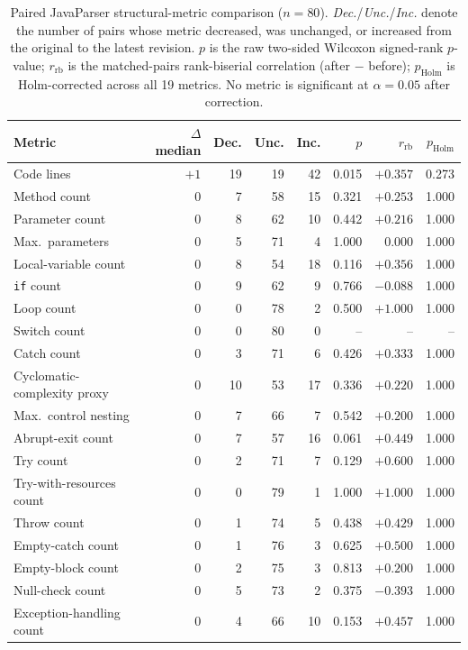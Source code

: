 \begin{table}[htbp]
\centering
\caption{Paired JavaParser structural-metric comparison ($n=80$).
\emph{Dec.}/\emph{Unc.}/\emph{Inc.} denote the number of pairs whose
metric decreased, was unchanged, or increased from the original to the
latest revision. $p$ is the raw two-sided Wilcoxon signed-rank
$p$-value; $r_{\text{rb}}$ is the matched-pairs rank-biserial correlation
(after $-$ before); $p_{\text{Holm}}$ is Holm-corrected across all 19
metrics. No metric is significant at $\alpha=0.05$ after correction.}
\label{tab:ba-javaparser}
\small
\begin{tabular}{lrrrrrrr}
\toprule
Metric & $\Delta$ median & Dec. & Unc. & Inc. & $p$ & $r_{\text{rb}}$ & $p_{\text{Holm}}$ \\
\midrule
Code lines                & $+1$ & 19 & 19 & 42 & 0.015 & $+0.357$ & 0.273 \\
Method count               & $0$  & 7  & 58 & 15 & 0.321  & $+0.253$ & 1.000 \\
Parameter count             & $0$  & 8  & 62 & 10 & 0.442  & $+0.216$ & 1.000 \\
Max.\ parameters            & $0$  & 5  & 71 & 4  & 1.000  & $0.000$ & 1.000 \\
Local-variable count        & $0$  & 8  & 54 & 18 & 0.116  & $+0.356$ & 1.000 \\
\texttt{if} count            & $0$  & 9  & 62 & 9  & 0.766  & $-0.088$ & 1.000 \\
Loop count                  & $0$  & 0  & 78 & 2  & 0.500  & $+1.000$ & 1.000 \\
Switch count                 & $0$  & 0  & 80 & 0  & --     & --  & --    \\
Catch count                  & $0$  & 3  & 71 & 6  & 0.426  & $+0.333$ & 1.000 \\
Cyclomatic-complexity proxy  & $0$  & 10 & 53 & 17 & 0.336  & $+0.220$ & 1.000 \\
Max.\ control nesting        & $0$  & 7  & 66 & 7  & 0.542  & $+0.200$ & 1.000 \\
Abrupt-exit count            & $0$  & 7  & 57 & 16 & 0.061 & $+0.449$ & 1.000 \\
Try count                    & $0$  & 2  & 71 & 7  & 0.129  & $+0.600$ & 1.000 \\
Try-with-resources count     & $0$  & 0  & 79 & 1  & 1.000  & $+1.000$ & 1.000 \\
Throw count                  & $0$  & 1  & 74 & 5  & 0.438  & $+0.429$ & 1.000 \\
Empty-catch count            & $0$  & 1  & 76 & 3  & 0.625  & $+0.500$ & 1.000 \\
Empty-block count            & $0$  & 2  & 75 & 3  & 0.813  & $+0.200$ & 1.000 \\
Null-check count             & $0$  & 5  & 73 & 2  & 0.375  & $-0.393$ & 1.000 \\
Exception-handling count     & $0$  & 4  & 66 & 10 & 0.153  & $+0.457$ & 1.000 \\
\bottomrule
\end{tabular}
\end{table}

